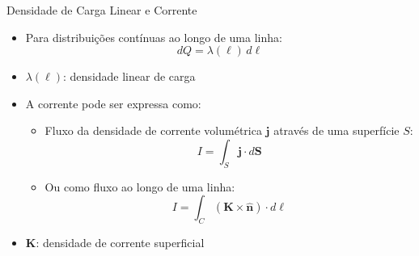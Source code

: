 \documentclass[aspectratio=169]{beamer}
\begin{document}
\begin{frame}{Densidade de Carga Linear e Corrente}

\begin{itemize}
    \item Para distribuições contínuas ao longo de uma linha:
    \begin{equation}
    dQ = \lambda(\ell)\, d\ell
    \label{eq:linear_charge}
    \end{equation}
    
    \item $\lambda(\ell)$: densidade linear de carga
    
    \vspace{0.3cm}
    
    \item A corrente pode ser expressa como:
    \begin{itemize}
        \item Fluxo da densidade de corrente volumétrica $\mathbf{j}$ através de uma superfície $S$:
        \begin{equation}
        I = \int_S \mathbf{j} \cdot d\mathbf{S}
        \label{eq:current_surface}
        \end{equation}
        
        \item Ou como fluxo ao longo de uma linha:
        \begin{equation}
        I = \int_C (\mathbf{K} \times \hat{\mathbf{n}})\cdot d\boldsymbol{\ell}
        \label{eq:current_line}
        \end{equation}
    \end{itemize}
    
    \item $\mathbf{K}$: densidade de corrente superficial
\end{itemize}

\end{frame}
\end{document}
